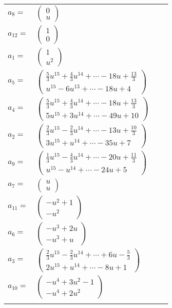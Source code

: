 \documentclass[1p]{elsarticle_modified}
\theoremstyle{definition}
\begin{document}
\begin{tabular}{m{7pt} m{180pt} m{7pt} m{180pt} }
\flushright $a_{8}=$&$\begin{pmatrix}0\\u\end{pmatrix}$ \\
\flushright $a_{12}=$&$\begin{pmatrix}1\\0\end{pmatrix}$ \\
\flushright $a_{1}=$&$\begin{pmatrix}1\\u^2\end{pmatrix}$ \\
\flushright $a_{5}=$&$\begin{pmatrix}\frac{5}{3} u^{15}+\frac{4}{3} u^{14}+\cdots-18 u+\frac{13}{3}\\u^{15}-6 u^{13}+\cdots-18 u+4\end{pmatrix}$ \\
\flushright $a_{4}=$&$\begin{pmatrix}\frac{5}{3} u^{15}+\frac{4}{3} u^{14}+\cdots-18 u+\frac{13}{3}\\5 u^{15}+3 u^{14}+\cdots-49 u+10\end{pmatrix}$ \\
\flushright $a_{2}=$&$\begin{pmatrix}\frac{2}{3} u^{15}-\frac{2}{3} u^{14}+\cdots-13 u+\frac{10}{3}\\3 u^{15}+u^{14}+\cdots-35 u+7\end{pmatrix}$ \\
\flushright $a_{9}=$&$\begin{pmatrix}\frac{1}{3} u^{15}-\frac{4}{3} u^{14}+\cdots-20 u+\frac{11}{3}\\u^{15}- u^{14}+\cdots-24 u+5\end{pmatrix}$ \\
\flushright $a_{7}=$&$\begin{pmatrix}u\\u\end{pmatrix}$ \\
\flushright $a_{11}=$&$\begin{pmatrix}- u^2+1\\- u^2\end{pmatrix}$ \\
\flushright $a_{6}=$&$\begin{pmatrix}- u^3+2 u\\- u^3+u\end{pmatrix}$ \\
\flushright $a_{3}=$&$\begin{pmatrix}\frac{2}{3} u^{15}-\frac{2}{3} u^{14}+\cdots+6 u-\frac{5}{3}\\2 u^{15}+u^{14}+\cdots-8 u+1\end{pmatrix}$ \\
\flushright $a_{10}=$&$\begin{pmatrix}- u^4+3 u^2-1\\- u^4+2 u^2\end{pmatrix}$\\&\end{tabular}
\end{document}
